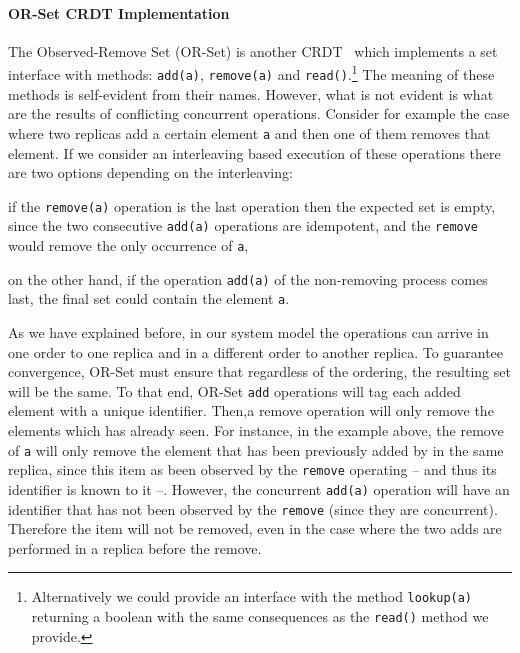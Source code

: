 

\paragraph{OR-Set CRDT Implementation} 

The Observed-Remove Set (OR-Set) is another CRDT~\cite{ShapiroPBZ11}
which implements a set interface with methods: \lstinline|add(a)|,
\lstinline|remove(a)| and \lstinline|read()|.\footnote{Alternatively
  we could provide an interface with the method \lstinline|lookup(a)|
  returning a boolean with the same consequences as the
  \lstinline|read()| method we provide.} 
%
The meaning of these methods is self-evident from their names.
%
However, what is not evident is what are the results of conflicting
concurrent operations. 
%
Consider for example the case where two replicas add a certain element
\lstinline|a| and then one of them removes that element.
%
If we consider an interleaving based execution of these operations
there are two options depending on the interleaving:
\begin{inparaenum}[i)]
\item if the \lstinline|remove(a)| operation is the last operation
  then the expected set is empty, since the two consecutive
  \lstinline|add(a)| operations are idempotent, and the
  \lstinline|remove| would remove the only occurrence of
  \lstinline|a|, 
\item on the other hand, if the operation \lstinline|add(a)| of the
  non-removing process comes last, the final set could contain the
  element \lstinline|a|.
\end{inparaenum}
As we have explained before, in our system model the operations can
arrive in one order to one replica and in a different order to another
replica.
%
To guarantee convergence, OR-Set must ensure that regardless of the
ordering, the resulting set will be the same. 
%
To that end, OR-Set \lstinline|add| operations will tag each added
element with a unique identifier. 
%
Then,a remove operation will only remove the elements which has
already seen.
%
For instance, in the example above, the remove of \lstinline|a| will
only remove the element that has been previously added by in the same
replica, since this item as been observed by the \lstinline|remove|
operating -- and thus its identifier is known to it --. However, the
concurrent \lstinline|add(a)| operation will have an identifier that
has not been observed by the \lstinline|remove| (since they are
concurrent). 
%
Therefore the item will not be removed, even in the case where the two
adds are performed in a replica before the remove. 

